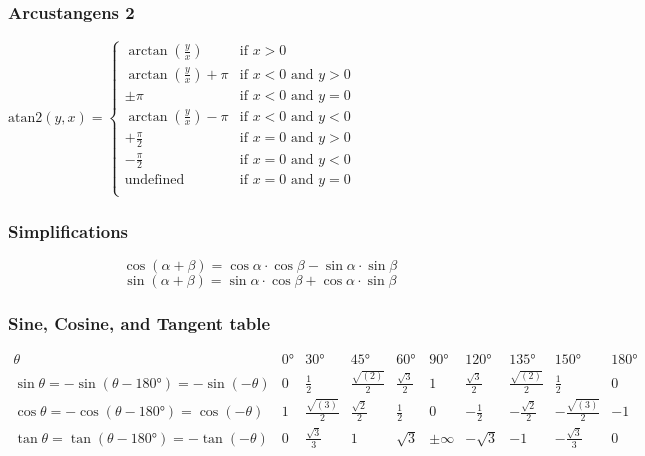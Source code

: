 \documentclass[10pt,a4paper]{article}
\newcommand{\atan}{\ensuremath{\mathrm{atan2 }}}
\begin{document}
\subsubsection{Arcustangens 2}
$\atan(y,x) = \begin{cases}
\arctan (\frac y x) & \text{if } x > 0 \\
\arctan (\frac y x) + \pi & \text{if } x < 0 \text{ and } y > 0 \\
\pm \pi & \text{if } x < 0 \text{ and } y = 0 \\
\arctan (\frac y x) - \pi & \text{if } x < 0 \text{ and } y < 0 \\
+ \frac \pi 2 & \text{if } x = 0 \text{ and } y > 0 \\
- \frac \pi 2 & \text{if } x = 0 \text{ and } y < 0 \\
\text{undefined} & \text{if } x = 0 \text{ and } y = 0 \\
\end{cases}$

\subsubsection{Simplifications}
$$
\cos(\alpha + \beta) = \cos \alpha ⋅ \cos \beta - \sin \alpha ⋅ \sin \beta
$$
$$
\sin(\alpha + \beta) = \sin \alpha ⋅ \cos \beta + \cos \alpha ⋅ \sin \beta
$$

\renewcommand{\arraystretch}{2}
\subsubsection{Sine, Cosine, and Tangent table}
$\begin{array}{l|ccccccccc}
\theta & 0° & 30° & 45° & 60° & 90° & 120° & 135° & 150° & 180° \\%
\hline
\hline
\sin\theta = -\sin(\theta - 180°) = -\sin(-\theta) & 0 & \frac 1 2 & \frac{\sqrt{(2)}}{2} & \frac{\sqrt{3}}{2} & 1 & \frac{\sqrt{3}}{2} & \frac{\sqrt{(2)}}{2} & \frac 1 2 & 0 \\
\cos\theta = -\cos(\theta - 180°) = \cos(-\theta) & 1 & \frac{\sqrt{(3)}}{2} & \frac{\sqrt{2}}{2} & \frac 1 2 & 0 & - \frac 1 2 & -\frac{\sqrt{2}}{2} & -\frac{\sqrt{(3)}}{2} & -1 \\
\tan\theta = \tan(\theta - 180°) = -\tan(-\theta) & 0 & \frac{\sqrt{3}}{3} & 1 & \sqrt{3} & \pm∞ & -{\sqrt{3}} & -1 & -\frac{\sqrt{3}}{3} & 0
\end{array}$
\end{document}
